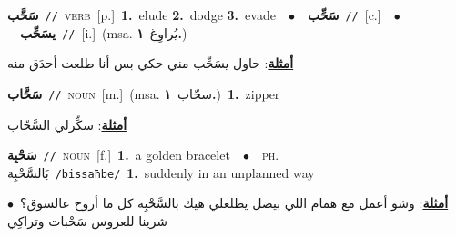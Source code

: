\documentclass[10pt,a4paper,twoside]{article} %
\begin{document}
\begin{multicols}{2}
{\setlength\topsep{0pt}\textbf{\foreignlanguage{arabic}{سَحَّب}}\ {\color{gray}\texttt{//}\color{black}}\ \textsc{verb}\ [p.]\ \textbf{1.}~elude  \textbf{2.}~dodge  \textbf{3.}~evade\ \ $\bullet$\ \ \setlength\topsep{0pt}\textbf{\foreignlanguage{arabic}{سَحِّب}}\ {\color{gray}\texttt{//}\color{black}}\ [c.]\ \ $\bullet$\ \ \setlength\topsep{0pt}\textbf{\foreignlanguage{arabic}{يسَحِّب}}\ {\color{gray}\texttt{//}\color{black}}\ [i.]\ \color{gray}(msa. \foreignlanguage{arabic}{يُراوِغ}~\foreignlanguage{arabic}{\textbf{١.}})\color{black}\  \begin{flushright}\color{gray}\foreignlanguage{arabic}{\textbf{\underline{\foreignlanguage{arabic}{أمثلة}}}: حاول يسَحِّب مني حكي بس أنا طلعت أحدَق منه}\end{flushright}\color{black}} \vspace{2mm}

{\setlength\topsep{0pt}\textbf{\foreignlanguage{arabic}{سَحَّاب}}\ {\color{gray}\texttt{//}\color{black}}\ \textsc{noun}\ [m.]\ \color{gray}(msa. \foreignlanguage{arabic}{سحّاب}~\foreignlanguage{arabic}{\textbf{١.}})\color{black}\ \textbf{1.}~zipper\  \begin{flushright}\color{gray}\foreignlanguage{arabic}{\textbf{\underline{\foreignlanguage{arabic}{أمثلة}}}: سكِّرلي السَّحّاب}\end{flushright}\color{black}} \vspace{2mm}

{\setlength\topsep{0pt}\textbf{\foreignlanguage{arabic}{سَحْبِة}}\ {\color{gray}\texttt{//}\color{black}}\ \textsc{noun}\ [f.]\ \textbf{1.}~a golden bracelet\ \ $\bullet$\ \ \textsc{ph.} \color{gray} \foreignlanguage{arabic}{بَالسَّحْبِة}\color{black}\ {\color{gray}\texttt{/{\sffamily bissaħbe}/}\color{black}}\ \textbf{1.}~suddenly in an unplanned way\  \begin{flushright}\color{gray}\foreignlanguage{arabic}{\textbf{\underline{\foreignlanguage{arabic}{أمثلة}}}: وشو أعمل مع همام اللي بيضل يطلعلي هيك بالسَّحْبِة كل ما أروح عالسوق؟\ $\bullet$\ \  شرينا للعروس سَحْبات وتراكِي}\end{flushright}\color{black}} \vspace{2mm}


\end{multicols}
\end{document}
